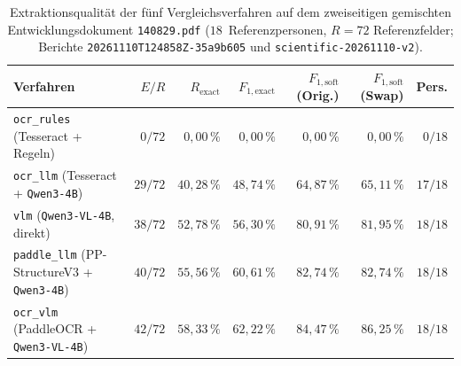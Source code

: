 \begin{table}[htbp]
  \centering
  \caption[Extraktionsqualität auf dem gemischten Entwicklungsdokument 140829]{Extraktionsqualität der fünf Vergleichsverfahren auf dem zweiseitigen gemischten Entwicklungsdokument \texttt{140829.pdf} ($18$~Referenzpersonen, $R = 72$ Referenzfelder; Berichte \texttt{20261110T124858Z-35a9b605} und \texttt{scientific-20261110-v2}).}
  \label{tab:ergebnisse-140829}
  \footnotesize
  \setlength{\tabcolsep}{4.5pt}
  \begin{tabularx}{\textwidth}{@{}>{\raggedright\arraybackslash}X r r r r r r@{}}
    \toprule
    \textbf{Verfahren} & \textbf{$E / R$} & \textbf{$R_{\mathrm{exact}}$} & \textbf{$F_{1,\mathrm{exact}}$} & \textbf{$F_{1,\mathrm{soft}}$ (Orig.)} & \textbf{$F_{1,\mathrm{soft}}$ (Swap)} & \textbf{Pers.} \\
    \midrule
    \texttt{ocr\_rules} (Tesseract + Regeln) & $0 / 72$ & $0{,}00\,\%$ & $0{,}00\,\%$ & $0{,}00\,\%$ & $0{,}00\,\%$ & $0 / 18$ \\
    \texttt{ocr\_llm} (Tesseract + \texttt{Qwen3-4B}) & $29 / 72$ & $40{,}28\,\%$ & $48{,}74\,\%$ & $64{,}87\,\%$ & $65{,}11\,\%$ & $17 / 18$ \\
    \texttt{vlm} (\texttt{Qwen3-VL-4B}, direkt) & $38 / 72$ & $52{,}78\,\%$ & $56{,}30\,\%$ & $80{,}91\,\%$ & $81{,}95\,\%$ & $18 / 18$ \\
    \texttt{paddle\_llm} (PP-StructureV3 + \texttt{Qwen3-4B}) & $40 / 72$ & $55{,}56\,\%$ & $60{,}61\,\%$ & $82{,}74\,\%$ & $82{,}74\,\%$ & $18 / 18$ \\
    \texttt{ocr\_vlm} (PaddleOCR + \texttt{Qwen3-VL-4B}) & $42 / 72$ & $58{,}33\,\%$ & $62{,}22\,\%$ & $84{,}47\,\%$ & $86{,}25\,\%$ & $18 / 18$ \\
    \bottomrule
  \end{tabularx}
\end{table}


